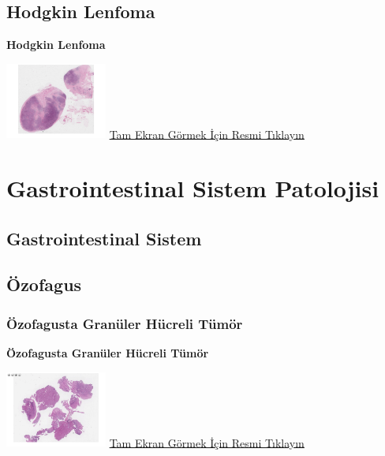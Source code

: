 \documentclass[
  letterpaper,
  DIV=11,
  numbers=noendperiod]{scrreprt}
\begin{document}
\hypertarget{sec-hodgkin-lenfoma}{%
\chapter{Hodgkin Lenfoma}\label{sec-hodgkin-lenfoma}}

\textbf{Hodgkin Lenfoma}

\href{https://images.patolojiatlasi.com/hodgkin/HE.html}{\includegraphics[width=0.25\textwidth,height=\textheight]{./screenshots/hodgkin_screenshot.png}}
\href{https://images.patolojiatlasi.com/hodgkin/HE.html}{Tam Ekran
Görmek İçin Resmi Tıklayın}

\part{Gastrointestinal Sistem Patolojisi}

\hypertarget{sec-gastrointestinal-sistem}{%
\chapter{Gastrointestinal Sistem}\label{sec-gastrointestinal-sistem}}

\hypertarget{sec-ozofagus}{%
\chapter{Özofagus}\label{sec-ozofagus}}

\hypertarget{sec-ozofagus-granuler-hucreli-tumor}{%
\section{Özofagusta Granüler Hücreli
Tümör}\label{sec-ozofagus-granuler-hucreli-tumor}}

\textbf{Özofagusta Granüler Hücreli Tümör}

\href{https://images.patolojiatlasi.com/granular-cell-tumor/HE.html}{\includegraphics[width=0.25\textwidth,height=\textheight]{./screenshots/granular-cell-tumor_screenshot.png}}
\href{https://images.patolojiatlasi.com/granular-cell-tumor/HE.html}{Tam
Ekran Görmek İçin Resmi Tıklayın}
\end{document}
